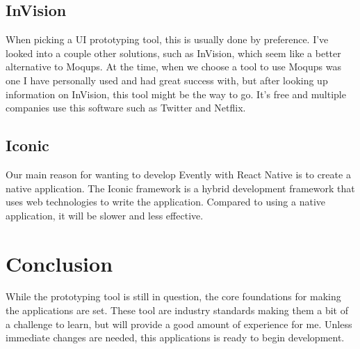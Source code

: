 \documentclass[letterpaper, 10pt,titlepage]{article}
\begin{document}
\subsection{InVision}

When picking a UI prototyping tool, this is usually done by preference. I've looked into a couple other solutions, such as InVision, which seem like a better alternative to Moqups. At the time, when we choose a tool to use Moqups was one I have personally used and had great success with, but after looking up information on InVision, this tool might be the way to go. It's free and multiple companies use this software such as Twitter and Netflix. 

\subsection{Iconic}

Our main reason for wanting to develop Evently with React Native is to create a native application. The Iconic framework is a hybrid development framework that uses web technologies to write the application. Compared to using a native application, it will be slower and less effective. 

\section{Conclusion}

While the prototyping tool is still in question, the core foundations for making the applications are set. These tool are industry standards making them a bit of a challenge to learn, but will provide a good amount of experience for me. Unless immediate changes are needed, this applications is ready to begin development.
\end{document}
